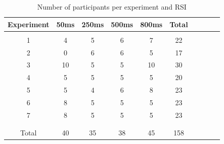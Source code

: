 \documentclass{apa}[12pt]
\begin{document}
%

\begin{table}[t]
\centering
\caption[Number of participants per experiment and RSI]{Number of participants per experiment and RSI}
\label{table_subjects}
\begin{tabular}{c|cccccccc|c}
Experiment & 50ms & 250ms & 500ms & 800ms & Total
\\ \hline \\
1    & 4 & 5 & 6 & 7 & 22\\
2    & 0 & 6 & 6 & 5 & 17\\
3    & 10 & 5 & 5 & 10 & 30\\
4    & 5 & 5 & 5 & 5 & 20\\
5    & 5 & 4 & 6 & 8 & 23\\
6    & 8 & 5 & 5 & 5 & 23\\
7    & 8 & 5 & 5 & 5 & 23\\
\\ \hline \\
Total & 40 & 35 & 38 & 45 & 158

\end{tabular}
\end{table}
\end{document}
